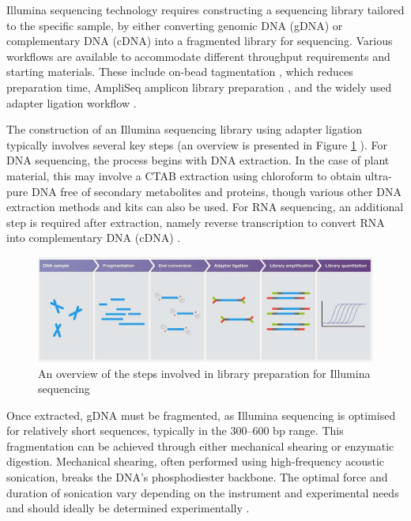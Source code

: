 Illumina sequencing technology requires constructing a sequencing library tailored to the specific sample, by either converting genomic DNA (gDNA) or complementary DNA (cDNA) into a fragmented library for sequencing. Various workflows are available to accommodate different throughput requirements and starting materials. These include on-bead tagmentation \cite{RN314}, which reduces preparation time, AmpliSeq amplicon library preparation \cite{RN315}, and the widely used adapter ligation workflow \cite{RN316}.

The construction of an Illumina sequencing library using adapter ligation typically involves several key steps (an overview is presented in Figure \ref{fig:illumina_library_prep} \cite{RN312}). For DNA sequencing, the process begins with DNA extraction. In the case of plant material, this may involve a CTAB extraction \cite{RN321} using chloroform to obtain ultra-pure DNA free of secondary metabolites and proteins, though various other DNA extraction methods and kits can also be used. For RNA sequencing, an additional step is required after extraction, namely reverse transcription to convert RNA into complementary DNA (cDNA) \cite{RN312,RN317}.

\begin{figure}[htbp!] 
\centering    
    \includegraphics[width=1\textwidth]{Chapter1/Figs/illumina_library_prep.jpg}
\caption{An overview of the steps involved in library preparation for Illumina sequencing \cite{RN312}}
\label{fig:illumina_library_prep}
\captionsetup{font=small}
\end{figure}

Once extracted, gDNA must be fragmented, as Illumina sequencing is optimised for relatively short sequences, typically in the 300–600 bp range. This fragmentation can be achieved through either mechanical shearing or enzymatic digestion. Mechanical shearing, often performed using high-frequency acoustic sonication, breaks the DNA’s phosphodiester backbone. The optimal force and duration of sonication vary depending on the instrument and experimental needs and should ideally be determined experimentally \cite{RN312}.

